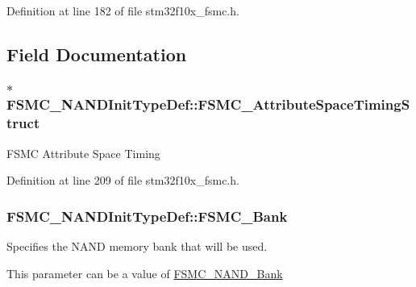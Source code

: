 Definition at line 182 of file stm32f10x\-\_\-fsmc.\-h.



\subsection{Field Documentation}
\hypertarget{struct_f_s_m_c___n_a_n_d_init_type_def_a586c3d691f1d786510cc75bf2b164f42}{
\subsubsection[{F\-S\-M\-C\-\_\-\-Attribute\-Space\-Timing\-Struct}]{ $\ast$ F\-S\-M\-C\-\_\-\-N\-A\-N\-D\-Init\-Type\-Def\-::\-F\-S\-M\-C\-\_\-\-Attribute\-Space\-Timing\-Struct}}\label{struct_f_s_m_c___n_a_n_d_init_type_def_a586c3d691f1d786510cc75bf2b164f42}
F\-S\-M\-C Attribute Space Timing 

Definition at line 209 of file stm32f10x\-\_\-fsmc.\-h.

\hypertarget{struct_f_s_m_c___n_a_n_d_init_type_def_a60d3ead2188e1dbdf06810e952b3ce0f}{
\subsubsection[{F\-S\-M\-C\-\_\-\-Bank}]{ F\-S\-M\-C\-\_\-\-N\-A\-N\-D\-Init\-Type\-Def\-::\-F\-S\-M\-C\-\_\-\-Bank}}\label{struct_f_s_m_c___n_a_n_d_init_type_def_a60d3ead2188e1dbdf06810e952b3ce0f}
\begin{DoxyVerb}                Specifies the NAND memory bank that will be used.
\end{DoxyVerb}
 This parameter can be a value of \hyperlink{group___f_s_m_c___n_a_n_d___bank}{F\-S\-M\-C\-\_\-\-N\-A\-N\-D\-\_\-\-Bank} 

